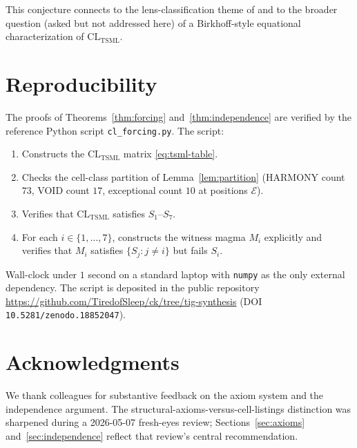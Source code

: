 \documentclass[11pt,reqno]{amsart}
\theoremstyle{plain}
\theoremstyle{definition}
\theoremstyle{remark}
\newcommand{\TSML}{\mathrm{TSML}}
\newcommand{\CL}{\mathrm{CL}}
\begin{document}
This conjecture connects to the lens-classification theme of
\cite{SandersGishFourCore} and to the broader question (asked but
not addressed here) of a Birkhoff-style equational characterization
of $\CL_{\TSML}$.

\section{Reproducibility}
\label{sec:repro}

The proofs of Theorems~\ref{thm:forcing} and~\ref{thm:independence}
are verified by the reference Python script
\texttt{cl\_forcing.py}. The script:

\begin{enumerate}
\item Constructs the $\CL_{\TSML}$ matrix \eqref{eq:tsml-table}.
\item Checks the cell-class partition of
Lemma~\ref{lem:partition} (HARMONY count $73$, VOID count $17$,
exceptional count $10$ at positions $\mathcal{E}$).
\item Verifies that $\CL_{\TSML}$ satisfies $S_{1}$--$S_{7}$.
\item For each $i \in \{1, \ldots, 7\}$, constructs the witness
magma $M_{i}$ explicitly and verifies that $M_{i}$ satisfies
$\{S_{j} : j \neq i\}$ but fails $S_{i}$.
\end{enumerate}

Wall-clock under $1$ second on a standard laptop with
\texttt{numpy} as the only external dependency. The script is
deposited in the public repository
\url{https://github.com/TiredofSleep/ck/tree/tig-synthesis} (DOI
\texttt{10.5281/zenodo.18852047}).

\section*{Acknowledgments}
We thank colleagues for substantive feedback on the axiom system
and the independence argument. The structural-axioms-versus-cell-listings
distinction was sharpened during a 2026-05-07 fresh-eyes review;
Sections~\ref{sec:axioms} and~\ref{sec:independence} reflect that
review's central recommendation.
\end{document}
